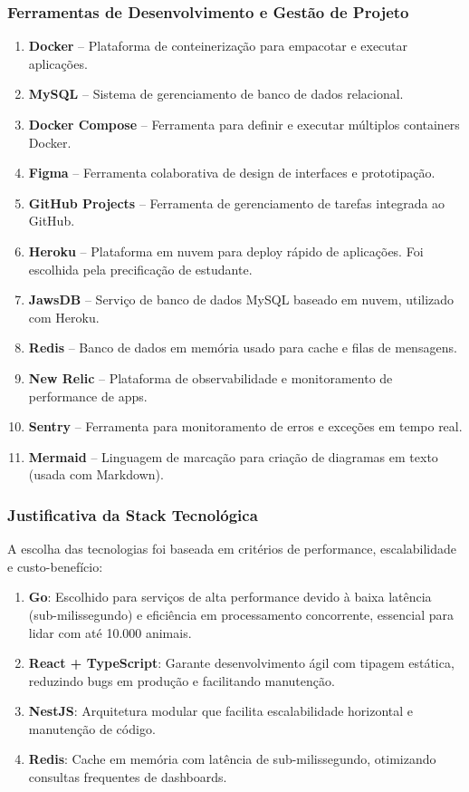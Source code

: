 \documentclass[12pt, a4paper]{article}
\begin{document}
\begin{spacing}{1.5}
\subsubsection{Ferramentas de Desenvolvimento e Gestão de Projeto}
\begin{enumerate}[label=\alph*)]
\item \textbf{Docker} – Plataforma de conteinerização para empacotar e executar aplicações.
\item \textbf{MySQL} – Sistema de gerenciamento de banco de dados relacional.
\item \textbf{Docker Compose} – Ferramenta para definir e executar múltiplos containers Docker.
\item \textbf{Figma} – Ferramenta colaborativa de design de interfaces e prototipação.
\item \textbf{GitHub Projects} – Ferramenta de gerenciamento de tarefas integrada ao GitHub.
\item \textbf{Heroku} – Plataforma em nuvem para deploy rápido de aplicações. Foi escolhida pela precificação de estudante.
\item \textbf{JawsDB} – Serviço de banco de dados MySQL baseado em nuvem, utilizado com Heroku.
\item \textbf{Redis} – Banco de dados em memória usado para cache e filas de mensagens.
\item \textbf{New Relic} – Plataforma de observabilidade e monitoramento de performance de apps.
\item \textbf{Sentry} – Ferramenta para monitoramento de erros e exceções em tempo real.
\item \textbf{Mermaid} – Linguagem de marcação para criação de diagramas em texto (usada com Markdown).
\end{enumerate}

\subsubsection{Justificativa da Stack Tecnológica}
\begin{spacing}{1.5}
A escolha das tecnologias foi baseada em critérios de performance, escalabilidade e custo-benefício:

\begin{enumerate}[label=\alph*)]
\item \textbf{Go}: Escolhido para serviços de alta performance devido à baixa latência (sub-milissegundo) e eficiência em processamento concorrente, essencial para lidar com até 10.000 animais.
\item \textbf{React + TypeScript}: Garante desenvolvimento ágil com tipagem estática, reduzindo bugs em produção e facilitando manutenção.
\item \textbf{NestJS}: Arquitetura modular que facilita escalabilidade horizontal e manutenção de código.
\item \textbf{Redis}: Cache em memória com latência de sub-milissegundo, otimizando consultas frequentes de dashboards.
\end{enumerate}
\end{spacing}


\end{spacing}
\end{document}
